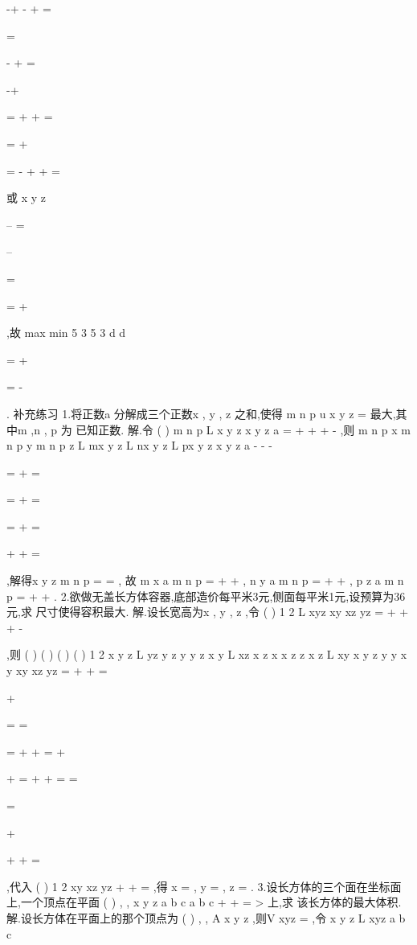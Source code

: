 -+
-
+
=

=



-
+
=


-+


\Rightarrow 
=
+
+
=




=
+

=
-
+
+
=




或
x
y
z

--
=



--

=


=
+


,故
max
min
5 3
5 3
d
d

=
+


=
-

. 
\textcolor{lyred}{补充练习 }
1.将正数a 分解成三个正数x , y , z 之和,使得
m
n
p
u
x y z
=
最大,其中m ,n , p 为 
已知正数. 
解.令
(
)
m
n
p
L
x y z
x
y
z
a
\lambda 
=
+
+
+
-
,则
m
n
p
x
m
n
p
y
m
n
p
z
L
mx
y z
L
nx y
z
L
px y z
x
y
z
a
\lambda 
\lambda 
\lambda 
-
-
-

=
+
=

=
+
=

=
+
=

+
+
=

,解得x
y
z
m
n
p
=
=
, 
故
m
x
a
m
n
p
=
+
+
,
n
y
a
m
n
p
=
+
+
,
p
z
a
m
n
p
=
+
+
. 
2.欲做无盖长方体容器,底部造价每平米3元,侧面每平米1元,设预算为36元,求 
尺寸使得容积最大. 
解.设长宽高为x , y , z ,令
(
)
1 2
L
xyz
xy
xz
yz
\lambda 
=
+
+\cdots 
+
-



,则 
(
)
(
)
(
)
(
)
1 2
x
y
z
L
yz
y
z
y
y
z
x
y
L
xz
x
z
x
x
z
z
x
z
L
xy
x
y
z
y
y
x
y
xy
xz
yz
\lambda 
\lambda 
\lambda 
=
+
+
=

+

=
=



=
+
+
=
+



\Rightarrow 
\Rightarrow 



+
=
+
+
=
=



=

+


+\cdots 
+
=


,代入 
(
)
1 2
xy
xz
yz
+\cdots 
+
=
,得
x =
,
y =
,
z =
. 
3.设长方体的三个面在坐标面上,一个顶点在平面
(
)
, ,
x
y
z
a b c
a
b
c
+
+
=
>
上,求 
该长方体的最大体积. 
解.设长方体在平面上的那个顶点为
(
)
, ,
A x y z ,则V
xyz
=
,令 
x
y
z
L
xyz
a
b
c
\lambda 

